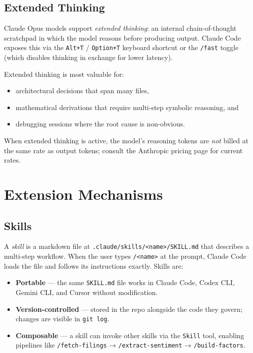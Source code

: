 \subsection{Extended Thinking}
\label{app:claude-code:thinking}

Claude Opus models support \emph{extended thinking}: an internal chain-of-thought
scratchpad in which the model reasons before producing output.  Claude Code
exposes this via the \texttt{Alt+T} / \texttt{Option+T} keyboard shortcut or
the \texttt{/fast} toggle (which disables thinking in exchange for lower
latency).

Extended thinking is most valuable for:
\begin{itemize}
  \item architectural decisions that span many files,
  \item mathematical derivations that require multi-step symbolic reasoning, and
  \item debugging sessions where the root cause is non-obvious.
\end{itemize}

When extended thinking is active, the model's reasoning tokens are \emph{not}
billed at the same rate as output tokens; consult the Anthropic pricing page for
current rates.

\section{Extension Mechanisms}
\label{app:claude-code:extensions}

\subsection{Skills}
\label{app:claude-code:skills}

A \emph{skill} is a markdown file at
\texttt{.claude/skills/\textless{}name\textgreater{}/SKILL.md} that describes a
multi-step workflow.  When the user types \texttt{/\textless{}name\textgreater{}}
at the prompt, Claude Code loads the file and follows its instructions exactly.
Skills are:

\begin{itemize}
  \item \textbf{Portable} --- the same \texttt{SKILL.md} file works in Claude
        Code, Codex CLI, Gemini CLI, and Cursor without modification.
  \item \textbf{Version-controlled} --- stored in the repo alongside the code
        they govern; changes are visible in \texttt{git log}.
  \item \textbf{Composable} --- a skill can invoke other skills via the
        \texttt{Skill} tool, enabling pipelines like
        \texttt{/fetch-filings} → \texttt{/extract-sentiment} →
        \texttt{/build-factors}.
\end{itemize}

